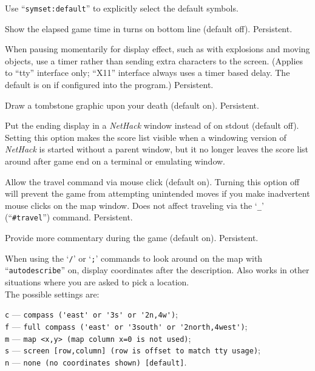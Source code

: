 Use ``{\tt symset:default}'' to explicitly select the default symbols.
\item[\ib{time}]
Show the elapsed game time in turns on bottom line (default off).  Persistent.
\item[\ib{timed\verb+_+delay}]
When pausing momentarily for display effect, such as with explosions and
moving objects, use a timer rather than sending extra characters to the
screen.  (Applies to ``tty'' interface only; ``X11'' interface always
uses a timer based delay.  The default is on if configured into the
program.)  Persistent.
\item[\ib{tombstone}]
Draw a tombstone graphic upon your death (default on).  Persistent.
\item[\ib{toptenwin}]
Put the ending display in a {\it NetHack\/} window instead of on stdout (default off).
Setting this option makes the score list visible when a windowing version
of {\it NetHack\/} is started without a parent window, but it no longer leaves
the score list around after game end on a terminal or emulating window.
\item[\ib{travel}]
Allow the travel command via mouse click (default on).
Turning this option off will prevent the game from attempting unintended
moves if you make inadvertent mouse clicks on the map window.
Does not affect traveling via the `{\tt \verb+_+}' (``{\tt \#travel}'')
command.  Persistent.
\item[\ib{verbose}]
Provide more commentary during the game (default on).  Persistent.
\item[\ib{whatis\verb+_+coord}]
When using the `{\tt /}' or `{\tt ;}' commands to look around on the map with
``{\tt autodescribe}''
on, display coordinates after the description.
Also works in other situations where you are asked to pick a location.\\

The possible settings are:

{\tt c} --- \verb#compass ('east' or '3s' or '2n,4w')#;\\
{\tt f} --- \verb#full compass ('east' or '3south' or '2north,4west')#;\\
{\tt m} --- \verb#map <x,y> (map column x=0 is not used)#;\\
{\tt s} --- \verb#screen [row,column] (row is offset to match tty usage)#;\\
{\tt n} --- \verb#none (no coordinates shown) [default]#.


